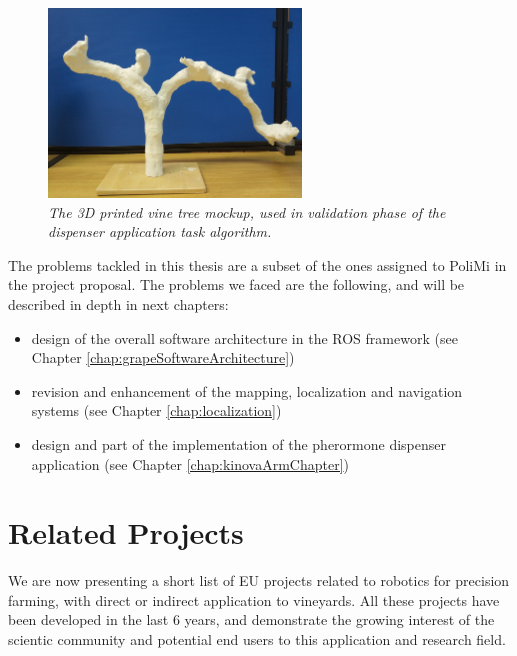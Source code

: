 \begin{figure}
	\centering
	\includegraphics[width=0.6\textwidth]{Images/grape_project/mockupPlant.jpg}
	\caption{\textit{The 3D printed vine tree mockup, used in validation phase of the dispenser application task algorithm.}}
	\label{fig:mockupPlant}
\end{figure}

The problems tackled in this thesis are a subset of the ones assigned to PoliMi in the project proposal. The problems we faced are the following, and will be described in depth in next chapters:
\begin{itemize}
	\item design of the overall software architecture in the \ac{ROS} framework (see Chapter \ref{chap:grapeSoftwareArchitecture})
	\item revision and enhancement of the mapping, localization and navigation systems (see Chapter \ref{chap:localization})
	\item design and part of the implementation of the pherormone dispenser application (see Chapter \ref{chap:kinovaArmChapter})
\end{itemize}

\section{Related Projects} \label{sec:relatedProjects}

We are now presenting a short list of EU projects related to robotics for precision farming, with direct or indirect application to vineyards. All these projects have been developed in the last 6 years, and demonstrate the growing interest of the scientic community and potential end users to this application and research field.

